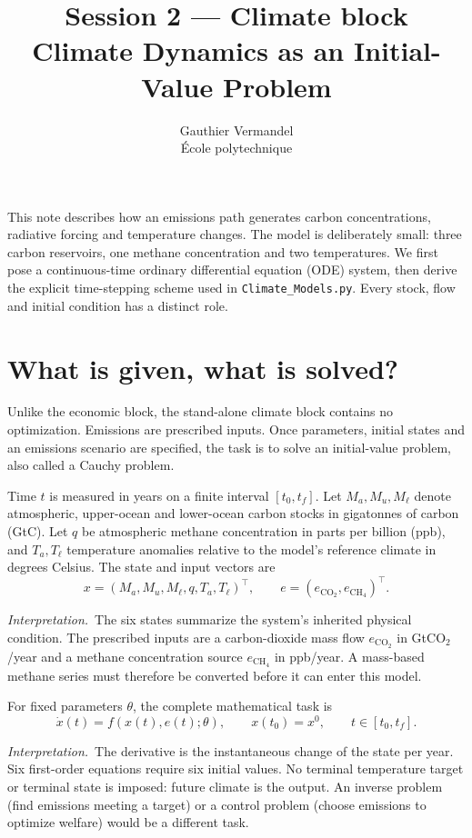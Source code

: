 \documentclass[11pt,a4paper]{article}
\title{\small Session 2 --- Climate block\\[0.6em]
\LARGE Climate Dynamics as an Initial-Value Problem}
\author{Gauthier Vermandel\\\small \'Ecole polytechnique}
\date{}
\newcommand{\interp}{\par\smallskip\noindent\textit{Interpretation.}\ }
\begin{document}
\maketitle

This note describes how an emissions path generates carbon concentrations,
radiative forcing and temperature changes. The model is deliberately small:
three carbon reservoirs, one methane concentration and two temperatures.
We first pose a continuous-time ordinary differential equation (ODE) system,
then derive the explicit time-stepping scheme used in
\texttt{Climate\_Models.py}. Every stock, flow and initial condition has a
distinct role.

\section{What is given, what is solved?}
Unlike the economic block, the stand-alone climate block contains no
optimization. Emissions are prescribed inputs. Once parameters, initial
states and an emissions scenario are specified, the task is to solve an
initial-value problem, also called a Cauchy problem.

Time $t$ is measured in years on a finite interval $[t_0,t_f]$.
Let $M_a,M_u,M_\ell$ denote atmospheric, upper-ocean and lower-ocean carbon
stocks in gigatonnes of carbon (GtC). Let $q$ be atmospheric methane
concentration in parts per billion (ppb), and $T_a,T_\ell$ temperature
anomalies relative to the model's reference climate in degrees Celsius.
The state and input vectors are
\begin{equation}\label{eq:vectors}
 x=(M_a,M_u,M_\ell,q,T_a,T_\ell)^\top,\qquad
 e=(e_{\mathrm{CO_2}},e_{\mathrm{CH_4}})^\top .
\end{equation}
\interp The six states summarize the system's inherited physical condition.
The prescribed inputs are a carbon-dioxide mass flow
$e_{\mathrm{CO_2}}$ in GtCO$_2$/year and a methane concentration source
$e_{\mathrm{CH_4}}$ in ppb/year. A mass-based methane series must therefore
be converted before it can enter this model.

For fixed parameters $\theta$, the complete mathematical task is
\begin{equation}\label{eq:cauchy}
 \boxed{\dot x(t)=f(x(t),e(t);\theta),\qquad
 x(t_0)=x^0,\qquad t\in[t_0,t_f].}
\end{equation}
\interp The derivative is the instantaneous change of the state per year.
Six first-order equations require six initial values. No terminal
temperature target or terminal state is imposed: future climate is the
output. An inverse problem (find emissions meeting a target) or a control
problem (choose emissions to optimize welfare) would be a different task.
\end{document}
